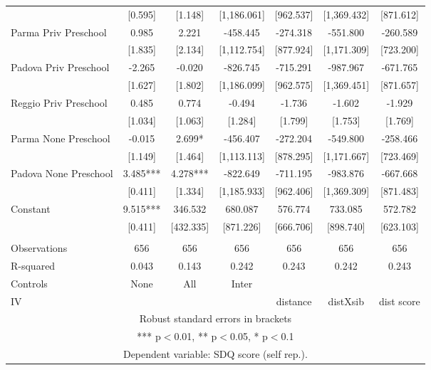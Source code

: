 \begin{tabular}{lcccccc}
 & [0.595] & [1.148] & [1,186.061] & [962.537] & [1,369.432] & [871.612] \\
Parma Priv Preschool & 0.985 & 2.221 & -458.445 & -274.318 & -551.800 & -260.589 \\
 & [1.835] & [2.134] & [1,112.754] & [877.924] & [1,171.309] & [723.200] \\
Padova Priv Preschool & -2.265 & -0.020 & -826.745 & -715.291 & -987.967 & -671.765 \\
 & [1.627] & [1.802] & [1,186.099] & [962.575] & [1,369.451] & [871.657] \\
Reggio Priv Preschool & 0.485 & 0.774 & -0.494 & -1.736 & -1.602 & -1.929 \\
 & [1.034] & [1.063] & [1.284] & [1.799] & [1.753] & [1.769] \\
Parma None Preschool & -0.015 & 2.699* & -456.407 & -272.204 & -549.800 & -258.466 \\
 & [1.149] & [1.464] & [1,113.113] & [878.295] & [1,171.667] & [723.469] \\
Padova None Preschool & 3.485*** & 4.278*** & -822.649 & -711.195 & -983.876 & -667.668 \\
 & [0.411] & [1.334] & [1,185.933] & [962.406] & [1,369.309] & [871.483] \\
Constant & 9.515*** & 346.532 & 680.087 & 576.774 & 733.085 & 572.782 \\
 & [0.411] & [432.335] & [871.226] & [666.706] & [898.740] & [623.103] \\
 &  &  &  &  &  &  \\
Observations & 656 & 656 & 656 & 656 & 656 & 656 \\
R-squared & 0.043 & 0.143 & 0.242 & 0.243 & 0.242 & 0.243 \\
Controls & None & All & Inter &  &  &  \\
 IV &  &  &  & distance & distXsib & dist score \\ \hline
\multicolumn{7}{c}{ Robust standard errors in brackets} \\
\multicolumn{7}{c}{ *** p$<$0.01, ** p$<$0.05, * p$<$0.1} \\
\multicolumn{7}{c}{ Dependent variable: SDQ score (self rep.).} \\
\end{tabular}
